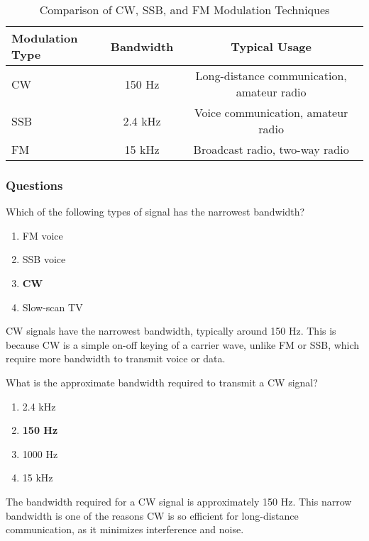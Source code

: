 \begin{table}[h]
    \centering
    \begin{tabular}{|l|c|c|}
        \hline
        \textbf{Modulation Type} & \textbf{Bandwidth} & \textbf{Typical Usage} \\
        \hline
        CW & 150 Hz & Long-distance communication, amateur radio \\
        SSB & 2.4 kHz & Voice communication, amateur radio \\
        FM & 15 kHz & Broadcast radio, two-way radio \\
        \hline
    \end{tabular}
    \caption{Comparison of CW, SSB, and FM Modulation Techniques}
    \label{tab:cw-comparison}
\end{table}

\subsubsection{Questions}

\begin{tcolorbox}[colback=gray!10!white,colframe=black!75!black,title={T8A05}]
    Which of the following types of signal has the narrowest bandwidth?
    \begin{enumerate}[label=\Alph*),noitemsep]
        \item FM voice
        \item SSB voice
        \item \textbf{CW}
        \item Slow-scan TV
    \end{enumerate}
\end{tcolorbox}
CW signals have the narrowest bandwidth, typically around 150 Hz. This is because CW is a simple on-off keying of a carrier wave, unlike FM or SSB, which require more bandwidth to transmit voice or data.

\begin{tcolorbox}[colback=gray!10!white,colframe=black!75!black,title={T8A11}]
    What is the approximate bandwidth required to transmit a CW signal?
    \begin{enumerate}[label=\Alph*),noitemsep]
        \item 2.4 kHz
        \item \textbf{150 Hz}
        \item 1000 Hz
        \item 15 kHz
    \end{enumerate}
\end{tcolorbox}
The bandwidth required for a CW signal is approximately 150 Hz. This narrow bandwidth is one of the reasons CW is so efficient for long-distance communication, as it minimizes interference and noise.
